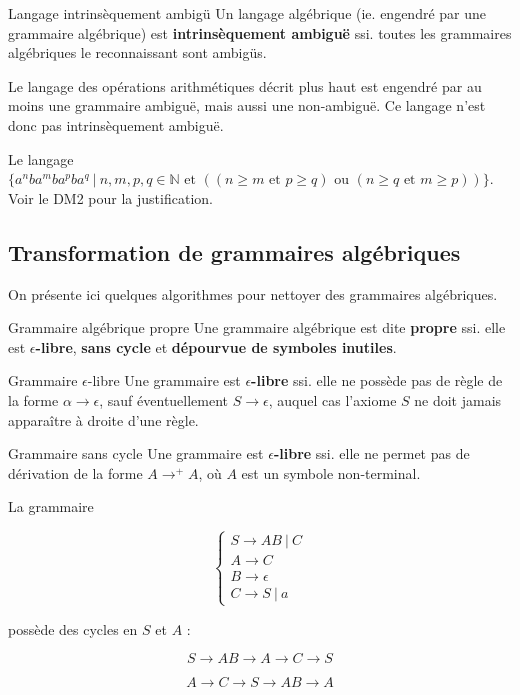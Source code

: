 \begin{definition}{Langage intrinsèquement ambigü}{}
Un langage algébrique (ie. engendré par une grammaire algébrique) est \textbf{intrinsèquement ambiguë} ssi. toutes les grammaires algébriques le reconnaissant sont ambigüs.
\end{definition}

\begin{example}
Le langage des opérations arithmétiques décrit plus haut est engendré par au moins une grammaire ambiguë, mais aussi une non-ambiguë. Ce langage n'est donc pas intrinsèquement ambiguë. 
\end{example}

\begin{example}
Le langage $\{a^nba^mba^pba^q ~|~ n,m,p,q \in \mathbb{N} \text{ et } ((n \geq m \text{ et } p \geq q) \text{ ou } (n \geq q \text{ et } m \geq p))\}$. Voir le DM2 pour la justification.
\end{example}

\subsection{Transformation de grammaires algébriques}

On présente ici quelques algorithmes pour nettoyer des grammaires algébriques.

\begin{definition}{Grammaire algébrique propre}{}
Une grammaire algébrique est dite \textbf{propre} ssi. elle est \textbf{$\epsilon$-libre}, \textbf{sans cycle} et \textbf{dépourvue de symboles inutiles}.
\end{definition}

\begin{definition}{Grammaire $\epsilon$-libre}{}
Une grammaire est \textbf{$\epsilon$-libre} ssi. elle ne possède pas de règle de la forme $\alpha \rightarrow \epsilon$, sauf éventuellement $S \rightarrow \epsilon$, auquel cas l'axiome $S$ ne doit jamais apparaître à droite d'une règle.
\end{definition}

\begin{definition}{Grammaire sans cycle}{}
Une grammaire est \textbf{$\epsilon$-libre} ssi. elle ne permet pas de dérivation de la forme $A \rightarrow^+ A$, où $A$ est un symbole non-terminal. 
\end{definition}

\begin{example}
\label{gramsscycle1}
La grammaire 

\[
\begin{cases}
S \rightarrow AB~|~C\\
A \rightarrow C \\
B \rightarrow \epsilon \\
C \rightarrow S~|~a 
\end{cases}
\]

possède des cycles en $S$ et $A$ :

\[
S \rightarrow AB \rightarrow A \rightarrow C \rightarrow S
\]

\[
A \rightarrow C \rightarrow S \rightarrow AB \rightarrow A
\]
\end{example}

